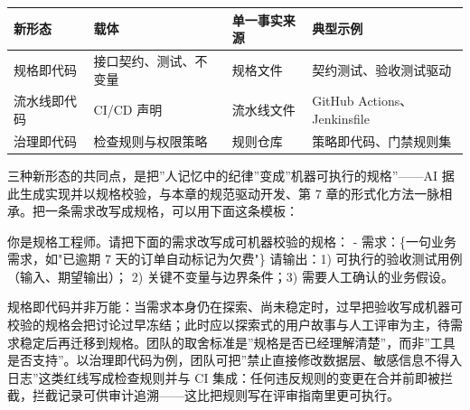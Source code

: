 \documentclass[
]{ctexbook}
\newenvironment{Shaded}{
  \ttfamily\small
}{}
\newcommand{\NormalTok}[1]{#1}
\newcounter{none}
\begin{document}
{\def\LTcaptype{none} %
\begin{longtable}[]{@{}
  >{\raggedright\arraybackslash}p{}
  >{\raggedright\arraybackslash}p{}
  >{\raggedright\arraybackslash}p{}
  >{\raggedright\arraybackslash}p{}@{}}
\toprule\noalign{}
\begin{minipage}[b]{\linewidth}\raggedright
新形态
\end{minipage} & \begin{minipage}[b]{\linewidth}\raggedright
载体
\end{minipage} & \begin{minipage}[b]{\linewidth}\raggedright
单一事实来源
\end{minipage} & \begin{minipage}[b]{\linewidth}\raggedright
典型示例
\end{minipage} \\
\midrule\noalign{}
\endhead
\bottomrule\noalign{}
\endlastfoot
规格即代码 & 接口契约、测试、不变量 & 规格文件 &
契约测试、验收测试驱动 \\
流水线即代码 & CI/CD 声明 & 流水线文件 & GitHub Actions、Jenkinsfile \\
治理即代码 & 检查规则与权限策略 & 规则仓库 & 策略即代码、门禁规则集 \\
\end{longtable}
}

三种新形态的共同点，是把''人记忆中的纪律''变成''机器可执行的规格''------AI
据此生成实现并以规格校验，与本章的规范驱动开发、第 7
章的形式化方法一脉相承。把一条需求改写成规格，可以用下面这条模板：

\begin{Shaded}
\begin{Highlighting}[]
\NormalTok{你是规格工程师。请把下面的需求改写成可机器校验的规格：}
\NormalTok{{-} 需求：\{一句业务需求，如"已逾期 7 天的订单自动标记为欠费"\}}
\NormalTok{请输出：1) 可执行的验收测试用例（输入、期望输出）；}
\NormalTok{2) 关键不变量与边界条件；3) 需要人工确认的业务假设。}
\end{Highlighting}
\end{Shaded}

规格即代码并非万能：当需求本身仍在探索、尚未稳定时，过早把验收写成机器可校验的规格会把讨论过早冻结；此时应以探索式的用户故事与人工评审为主，待需求稳定后再迁移到规格。团队的取舍标准是''规格是否已经理解清楚''，而非''工具是否支持''。以治理即代码为例，团队可把''禁止直接修改数据层、敏感信息不得入日志''这类红线写成检查规则并与
CI
集成：任何违反规则的变更在合并前即被拦截，拦截记录可供审计追溯------这比把规则写在评审指南里更可执行。
\end{document}
